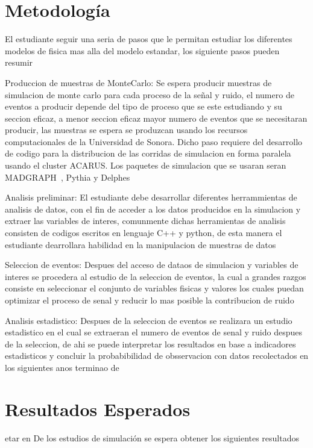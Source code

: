 \chapter{Metodología}

El estudiante seguir una seria de pasos que le permitan estudiar los diferentes modelos de fisica mas alla del modelo estandar, los siguiente pasos pueden resumir 


Produccion de muestras de MonteCarlo: Se espera producir muestras de simulacion de monte carlo para cada proceso de la se\~nal y ruido, el numero de eventos a producir depende del tipo de proceso que se este estudiando y su seccion eficaz, a menor seccion eficaz mayor numero de eventos que se necesitaran producir, las muestras se espera se produzcan usando los recursos computacionales de la Universidad de Sonora. Dicho paso requiere del desarrollo de codigo para la distribucion de las corridas de simulacion en forma paralela usando el cluster ACARUS. Los paquetes de simulacion que se usaran seran MADGRAPH~\cite{Alwall:2007st}, Pythia y Delphes~\cite{deFavereau2014}

Analisis preliminar: El estudiante debe desarrollar diferentes herrammientas de analisis de datos, con el fin de acceder a los datos producidos en la simulacion y extraer las variables de interes, comunmente dichas herramientas de analisis consisten de codigos escritos en lenguaje C++ y python, de esta manera el estudiante dearrollara habilidad en la manipulacion de muestras de datos 

Seleccion de eventos: Despues del acceso de dataos de simulacion y variables de interes se procedera al estudio de la seleccion de eventos, la cual a grandes razgos consiste en seleccionar el conjunto de variables fisicas y valores los cuales puedan optimizar el proceso de senal y reducir lo mas posible la contribucion de ruido 

Analisis estadistico: Despues de la seleccion de eventos se realizara un estudio estadistico en el cual se extraeran el numero de eventos de senal y ruido despues de la seleccion, de ahi se puede interpretar los resultados en base a indicadores estadisticos y concluir la probabibilidad de obsservacion con datos recolectados en los siguientes anos terminao de


\chapter{Resultados Esperados} 

etar en De los estudios de simulaci\'on se espera obtener los siguientes resultados

